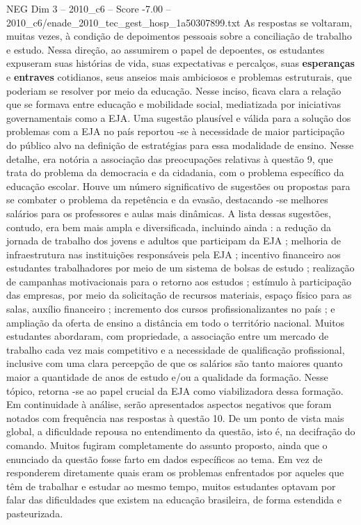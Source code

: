 \begin{textsample}{NEG Dim 3 – 2010\_c6 – Score -7.00 – 2010\_c6/enade\_2010\_tec\_gest\_hosp\_1a50307899.txt}
As respostas se voltaram, muitas vezes, à condição de depoimentos pessoais sobre a conciliação de trabalho e estudo.
Nessa direção, ao assumirem o papel de depoentes, os estudantes expuseram suas histórias de vida, suas expectativas e percalços, suas \textbf{esperanças} e \textbf{entraves} cotidianos, seus anseios mais ambiciosos e problemas estruturais, que poderiam se resolver por meio da educação.
Nesse inciso, ficava clara a relação que se formava entre educação e mobilidade social, mediatizada por iniciativas governamentais como a EJA.
Uma sugestão plausível e válida para a solução dos problemas com a EJA no país reportou -se à necessidade de maior participação do público alvo na definição de estratégias para essa modalidade de ensino.
Nesse detalhe, era notória a associação das preocupações relativas à questão 9, que trata do problema da democracia e da cidadania, com o problema específico da educação escolar.
Houve um número significativo de sugestões ou propostas para se combater o problema da repetência e da evasão, destacando -se melhores salários para os professores e aulas mais dinâmicas.
A lista dessas sugestões, contudo, era bem mais ampla e diversificada, incluindo ainda : a redução da jornada de trabalho dos jovens e adultos que participam da EJA ; melhoria de infraestrutura nas instituições responsáveis pela EJA ; incentivo financeiro aos estudantes trabalhadores por meio de um sistema de bolsas de estudo ; realização de campanhas motivacionais para o retorno aos estudos ; estímulo à participação das empresas, por meio da solicitação de recursos materiais, espaço físico para as salas, auxílio financeiro ; incremento dos cursos profissionalizantes no país ; e ampliação da oferta de ensino a distância em todo o território nacional.
Muitos estudantes abordaram, com propriedade, a associação entre um mercado de trabalho cada vez mais competitivo e a necessidade de qualificação profissional, inclusive com uma clara percepção de que os salários são tanto maiores quanto maior a quantidade de anos de estudo e/ou a qualidade da formação.
Nesse tópico, retorna -se ao papel crucial da EJA como viabilizadora dessa formação.
Em continuidade à análise, serão apresentados aspectos negativos que foram notados com frequência nas respostas à questão 10.
De um ponto de vista mais global, a dificuldade repousa no entendimento da questão, isto é, na decifração do comando.
Muitos fugiram completamente do assunto proposto, ainda que o enunciado da questão fosse farto em dados específicos ao tema.
Em vez de responderem diretamente quais eram os problemas enfrentados por aqueles que têm de trabalhar e estudar ao mesmo tempo, muitos estudantes optavam por falar das dificuldades que existem na educação brasileira, de forma estendida e pasteurizada.

\end{textsample}
